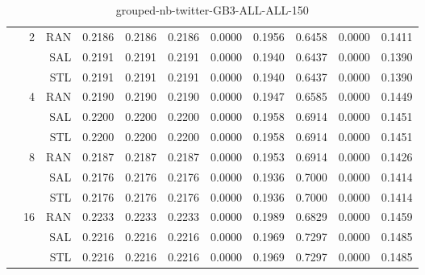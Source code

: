 \begin{center}
\begin{table}[htbp]
\begin{center}
\begin{tabular}{ | r | r | r | r | r | r | r | r | r | r | r |}
 & \multirow{3}{*}{2} & RAN & 0.2186 & 0.2186 & 0.2186 & 0.0000 & 0.1956 & 0.6458 & 0.0000 & 0.1411\\ \cline{3-11}
 &   & SAL & 0.2191 & 0.2191 & 0.2191 & 0.0000 & 0.1940 & 0.6437 & 0.0000 & 0.1390\\ \cline{3-11}
 &   & STL & 0.2191 & 0.2191 & 0.2191 & 0.0000 & 0.1940 & 0.6437 & 0.0000 & 0.1390\\ \cline{2-11}
 & \multirow{3}{*}{4} & RAN & 0.2190 & 0.2190 & 0.2190 & 0.0000 & 0.1947 & 0.6585 & 0.0000 & 0.1449\\ \cline{3-11}
 &   & SAL & 0.2200 & 0.2200 & 0.2200 & 0.0000 & 0.1958 & 0.6914 & 0.0000 & 0.1451\\ \cline{3-11}
 &   & STL & 0.2200 & 0.2200 & 0.2200 & 0.0000 & 0.1958 & 0.6914 & 0.0000 & 0.1451\\ \cline{2-11}
 & \multirow{3}{*}{8} & RAN & 0.2187 & 0.2187 & 0.2187 & 0.0000 & 0.1953 & 0.6914 & 0.0000 & 0.1426\\ \cline{3-11}
 &   & SAL & 0.2176 & 0.2176 & 0.2176 & 0.0000 & 0.1936 & 0.7000 & 0.0000 & 0.1414\\ \cline{3-11}
 &   & STL & 0.2176 & 0.2176 & 0.2176 & 0.0000 & 0.1936 & 0.7000 & 0.0000 & 0.1414\\ \cline{2-11}
 & \multirow{3}{*}{16} & RAN & 0.2233 & 0.2233 & 0.2233 & 0.0000 & 0.1989 & 0.6829 & 0.0000 & 0.1459\\ \cline{3-11}
 &   & SAL & 0.2216 & 0.2216 & 0.2216 & 0.0000 & 0.1969 & 0.7297 & 0.0000 & 0.1485\\ \cline{3-11}
 &   & STL & 0.2216 & 0.2216 & 0.2216 & 0.0000 & 0.1969 & 0.7297 & 0.0000 & 0.1485\\ \cline{2-11}
\hline
\end{tabular}
\caption{grouped-nb-twitter-GB3-ALL-ALL-150}
\end{center}
 \end{table}
\end{center}

